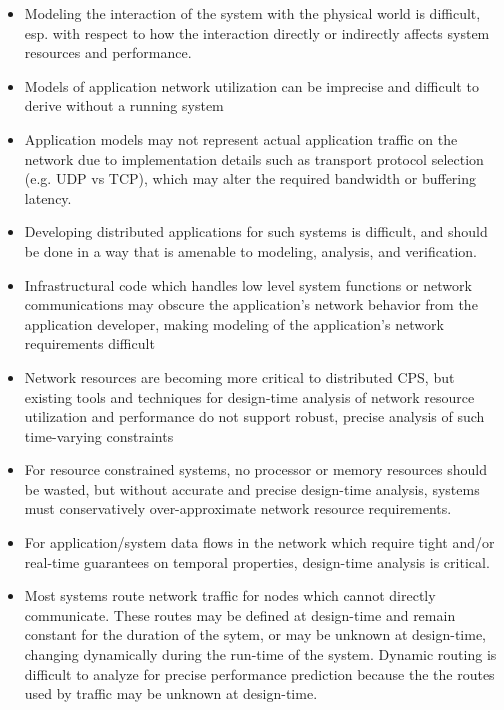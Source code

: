 \begin{itemize}
\item Modeling the interaction of the system with the physical world
  is difficult, esp. with respect to how the interaction directly or
  indirectly affects system resources and performance.
\item Models of application network utilization can be imprecise and
  difficult to derive without a running system
\item Application models may not represent actual application traffic
  on the network due to implementation details such as transport
  protocol selection (e.g. UDP vs TCP), which may alter the required
  bandwidth or buffering latency.
\item Developing distributed applications for such systems is
  difficult, and should be done in a way that is amenable to modeling,
  analysis, and verification.
\item Infrastructural code which handles low level system functions or
  network communications may obscure the application's network
  behavior from the application developer, making modeling of the
  application's network requirements difficult
\item Network resources are becoming more critical to distributed CPS,
  but existing tools and techniques for design-time analysis of
  network resource utilization and performance do not support robust,
  precise analysis of such time-varying constraints
\item For resource constrained systems, no processor or memory
  resources should be wasted, but without accurate and precise
  design-time analysis, systems must conservatively over-approximate
  network resource requirements.
\item For application/system data flows in the network which require
  tight and/or real-time guarantees on temporal properties,
  design-time analysis is critical.
\item Most systems route network traffic for nodes which cannot
  directly communicate. These routes may be defined at design-time and
  remain constant for the duration of the sytem, or may be unknown at
  design-time, changing dynamically during the run-time of the system.
  Dynamic routing is difficult to analyze for precise performance
  prediction because the the routes used by traffic may be unknown at
  design-time.  
\end{itemize}

